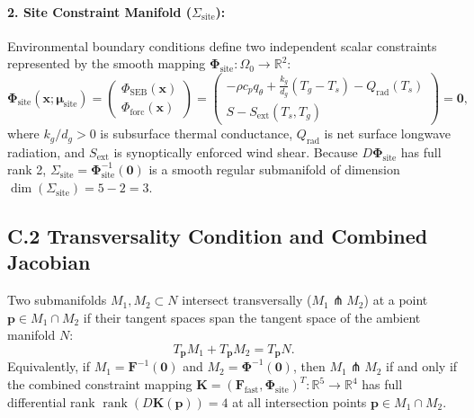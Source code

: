 \paragraph{2. Site Constraint Manifold ($\Sigma_{\mathrm{site}}$):}
Environmental boundary conditions define two independent scalar constraints represented by the smooth mapping $\boldsymbol{\Phi}_{\mathrm{site}} : \Omega_0 \to \mathbb{R}^2$:
\begin{equation}
\boldsymbol{\Phi}_{\mathrm{site}}(\mathbf{x}; \boldsymbol{\mu}_{\mathrm{site}}) =
\begin{pmatrix}
\Phi_{\mathrm{SEB}}(\mathbf{x}) \\[4pt]
\Phi_{\mathrm{forc}}(\mathbf{x})
\end{pmatrix}
=
\begin{pmatrix}
-\rho c_p q_\theta + \frac{k_g}{d_g}(T_g - T_s) - Q_{\mathrm{rad}}(T_s) \\[6pt]
S - S_{\mathrm{ext}}(T_s, T_g)
\end{pmatrix}
= \mathbf{0},
\end{equation}
where $k_g / d_g > 0$ is subsurface thermal conductance, $Q_{\mathrm{rad}}$ is net surface longwave radiation, and $S_{\mathrm{ext}}$ is synoptically enforced wind shear. Because $D\boldsymbol{\Phi}_{\mathrm{site}}$ has full rank 2, $\Sigma_{\mathrm{site}} = \boldsymbol{\Phi}_{\mathrm{site}}^{-1}(\mathbf{0})$ is a smooth regular submanifold of dimension $\dim(\Sigma_{\mathrm{site}}) = 5 - 2 = 3$.

\subsection*{C.2 Transversality Condition and Combined Jacobian}

\begin{definition}
Two submanifolds $M_1, M_2 \subset N$ intersect transversally ($M_1 \pitchfork M_2$) at a point $\mathbf{p} \in M_1 \cap M_2$ if their tangent spaces span the tangent space of the ambient manifold $N$:
\begin{equation}
T_{\mathbf{p}} M_1 + T_{\mathbf{p}} M_2 = T_{\mathbf{p}} N.
\end{equation}
Equivalently, if $M_1 = \mathbf{F}^{-1}(\mathbf{0})$ and $M_2 = \boldsymbol{\Phi}^{-1}(\mathbf{0})$, then $M_1 \pitchfork M_2$ if and only if the combined constraint mapping $\mathbf{K} = (\mathbf{F}_{\mathrm{fast}}, \boldsymbol{\Phi}_{\mathrm{site}})^T : \mathbb{R}^5 \to \mathbb{R}^4$ has full differential rank $\operatorname{rank}(D\mathbf{K}(\mathbf{p})) = 4$ at all intersection points $\mathbf{p} \in M_1 \cap M_2$.
\end{definition}

